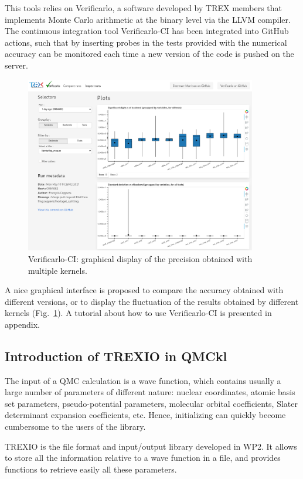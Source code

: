 This tools relies on Verificarlo,\cite{verificarlo} a software
developed by TREX members that implements Monte Carlo arithmetic at
the binary level via the LLVM compiler. The continuous integration
tool Verificarlo-CI has been integrated into GitHub actions, such that
by inserting probes in the tests provided with \QMCkl{} the numerical
accuracy can be monitored each time a new version of the code is
pushed on the server.

\begin{figure}
\centering
  \includegraphics[width=0.9\textwidth]{images/inspect_runs.png}
  \caption{Verificarlo-CI: graphical display of the precision obtained
    with multiple kernels.}
    \label{fig:vfci}
\end{figure}
A nice graphical interface is proposed to compare the accuracy
obtained with different versions, or to display the fluctuation of
the results obtained by different kernels (Fig.~\ref{fig:vfci}).
A tutorial about how to use Verificarlo-CI is presented in appendix.

\subsection{Introduction of TREXIO in QMCkl}

The input of a \ac{QMC} calculation is a wave function, which
contains usually a large number of parameters of different nature:
nuclear coordinates, atomic basis set parameters, pseudo-potential
parameters, molecular orbital coefficients, Slater determinant
expansion coefficients, etc.
Hence, initializing \QMCkl{} can quickly become cumbersome to the users
of the library.

\ac{TREXIO} is the file format and input/output library developed in
\ac{WP}2. It allows to store all the information relative to a wave
function in a file, and provides functions to retrieve easily all
these parameters. 


